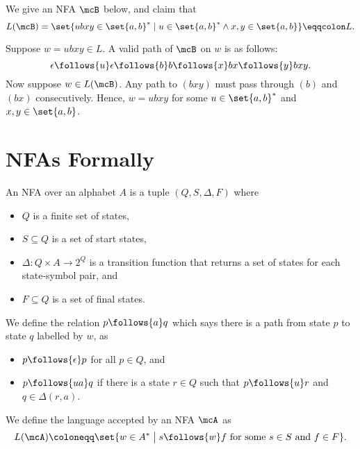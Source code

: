 \begin{solution} \leavevmode
    We give an NFA $\mcB$ below, and claim that \[
        L(\mcB) = \set{ubxy \in \set{a, b}^*
            \mid u \in \set{a, b}^* \land x, y \in \set{a, b}} \eqqcolon L.
    \]
    \begin{center}
    \end{center}
    Suppose $w = ubxy \in L$.
    A valid path of $\mcB$ on $w$ is as follows: \[
        \epsilon \follows{u} \epsilon \follows{b} b
        \follows{x} bx \follows{y} bxy.
    \]
    Now suppose $w \in L(\mcB)$.
    Any path to $(bxy)$ must pass through $(b)$ and $(bx)$ consecutively.
    Hence, $w = ubxy$ for some $u \in \set{a, b}^*$ and
    $x, y \in \set{a, b}$.
\end{solution}

\section{NFAs Formally} \label{sec:nfa:formal}
\begin{definition*}
    An NFA over an alphabet $A$ is a tuple $(Q, S, \Delta, F)$ where
    \begin{itemize}
        \item $Q$ is a finite set of states,
        \item $S \subseteq Q$ is a set of start states,
        \item $\Delta\colon Q \times A \to 2^Q$ is a transition function
        that returns a set of states for each state-symbol pair, and
        \item $F \subseteq Q$ is a set of final states.
    \end{itemize}
    We define the relation $p \follows{a} q$ which says there is a path
    from state  $p$ to state $q$ labelled by $w$, as
    \begin{itemize}
        \item $p \follows{\epsilon} p$ for all $p \in Q$, and
        \item $p \follows{ua} q$ if there is a state $r \in Q$ such that
        $p \follows{u} r$ and $q \in \Delta(r, a)$.
    \end{itemize}
    We define the language accepted by an NFA $\mcA$ as \[
        L(\mcA) \coloneqq \set{w \in A^* \;\big\vert\; s
        \follows{w} f \text{ for some } s \in S \text{ and } f \in F}.
    \]
\end{definition*}

